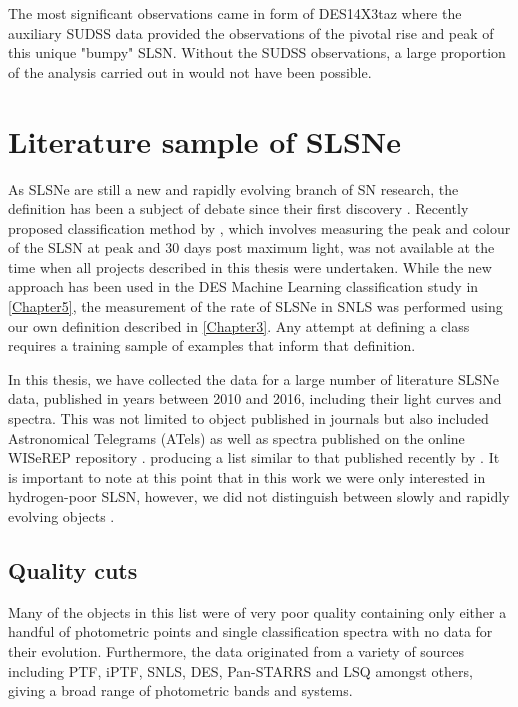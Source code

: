The most significant observations came in form of DES14X3taz where the auxiliary SUDSS data provided the observations of the pivotal rise and peak of this unique "bumpy" SLSN. Without the SUDSS observations, a large proportion of the analysis carried out in \citep{Smith2016} would not have been possible.

\section{Literature sample of SLSNe} \label{sec:litSample}
As SLSNe are still a new and rapidly evolving branch of SN research, the definition has been a subject of debate since their first discovery \citep{Gal-Yam2012, Inserra2013, Nicholl2014}. Recently proposed classification method by \citet{Inserra2018}, which involves measuring the peak and colour of the SLSN at peak and 30 days post maximum light, was not available at the time when all projects described in this thesis were undertaken. While the new approach has been used in the DES Machine Learning classification study in \cref{Chapter5}, the measurement of the rate of SLSNe in SNLS was performed using our own definition described in \cref{Chapter3}. Any attempt at defining a class requires a training sample of examples that inform that definition.

In this thesis, we have collected the data for a large number of literature SLSNe data, published in years between 2010 and 2016, including their light curves and spectra. This was not limited to object published in journals but also included Astronomical Telegrams (ATels) as well as spectra published on the online WISeREP repository \citep{Yaron2012}. producing a list similar to that published recently by \citet{Schulze2017}. It is important to note at this point that in this work we were only interested in hydrogen-poor SLSN, however, we did not distinguish between slowly and rapidly evolving objects \citep{Gal-Yam2012, Inserra2013}.

\subsection{Quality cuts}
Many of the objects in this list were of very poor quality containing only either a handful of photometric points and single classification spectra with no data for their evolution. Furthermore, the data originated from a variety of sources including PTF, iPTF, SNLS, DES, Pan-STARRS and LSQ amongst others, giving a broad range of photometric bands and systems.

